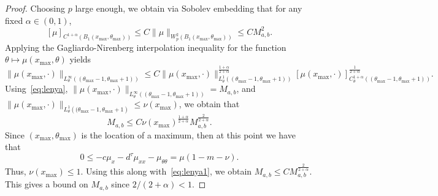 \documentclass[11pt]{article}    %
\begin{document}
\begin{proof}
Choosing $p$ large enough, we obtain via Sobolev embedding that for any fixed $\alpha \in (0,1)$,
\begin{equation}\label{eq:lenya}
	[\mu]_{C^{1+\alpha}(B_1(x_{\max}, \theta_{\max}))} \leq C\|\mu\|_{W^2_p(B_1(x_{\max}, \theta_{\max}))}
		\leq C M_{a,b}^2.
\end{equation}
Applying the Gagliardo-Nirenberg interpolation inequality for the function $\theta \mapsto \mu \left( x_{\max}, \theta \right)$ yields
\begin{equation*}
	\| \mu \left( x_{\max}, \cdot \right) \|_{L^\infty_\theta\left((\theta_{\max}-1,\theta_{\max}+1)\right)}
		\leq C \| \mu \left( x_{\max}, \cdot \right) \|_{L^1_\theta\left((\theta_{\max}-1,\theta_{\max}+1)\right)}^{\frac{1+\alpha}{2+\alpha}}
			\left[ \mu \left( x_{\max}, \cdot \right) \right]_{C^{1+\alpha}_\theta\left((\theta_{\max}-1,\theta_{\max}+1)\right)}^{\frac{1}{2+\alpha}}.
\end{equation*}
Using~\eqref{eq:lenya}, $\| \mu \left(x_{\max}, \cdot \right) \|_{L^\infty_\theta\left((\theta_{\max}-1,\theta_{\max}+1)\right)} = M_{a,b}$, and $\| \mu \left( x_{\max}, \cdot \right) \|_{L^1_\theta\left((\theta_{\max}-1,\theta_{\max}+1\right)} \leq \nu(x_{\max})$, we obtain that
\begin{equation}\label{eq:lenya1}
	M_{a,b}
		\leq C \nu(x_{\max})^{\frac{1+\alpha}{2+\alpha}}
			M_{a,b}^{\frac{2}{2+\alpha}}.
\end{equation}
Since $(x_{\max}, \theta_{\max})$ is the location of a maximum, then at this point we have that
\begin{equation}\label{eq:maximum_principal}
	0 \leq -c\mu_x - d^\tau \mu_{xx} - \mu_{\theta\theta}
		= \mu(1 - m - \nu).
\end{equation}
Thus, $\nu(x_{\max}) \leq 1$.  Using this along with~\eqref{eq:lenya1}, we obtain $M_{a,b} \leq C M_{a,b}^{\frac{2}{2+\alpha}}$.
This gives a bound on $M_{a,b}$ since $2/(2+\alpha) < 1$.
\end{proof}
\end{document}
